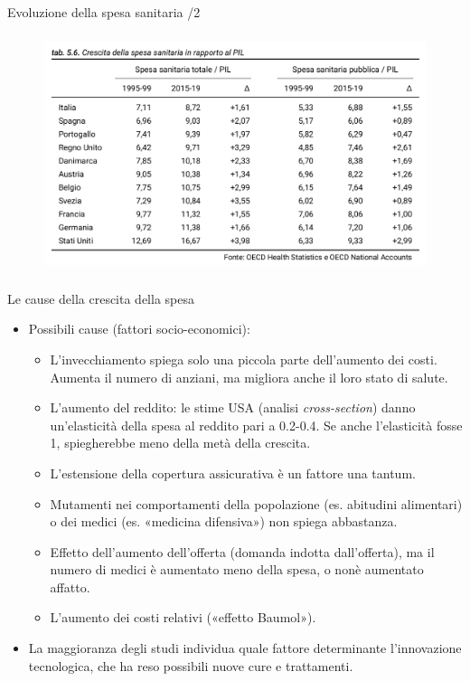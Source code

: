 \documentclass[aspectratio=64,12pt]{beamer}
\begin{document}
\begin{frame}{Evoluzione della spesa sanitaria /2}
\begin{figure}[htbp]
\centering
\includegraphics[height=7cm]{./figure/crescita-spesa-sanitaria.png}
\end{figure}
\end{frame}


\begin{frame}{Le cause della crescita della spesa}
\begin{itemize}
\item Possibili cause (fattori socio-economici):
\begin{itemize}
\item L'\alert{invecchiamento} spiega solo una piccola parte dell'aumento dei
costi. Aumenta il numero di anziani, ma migliora anche il loro stato di
salute.
\item L'\alert{aumento del reddito}: le stime USA (analisi
  \emph{cross-section}) danno un'elasticità della spesa al reddito pari a
  0.2-0.4. Se anche l'elasticità fosse 1, spiegherebbe meno della metà
  della crescita.
\item L'\alert{estensione della copertura assicurativa} è un fattore una tantum.
\item Mutamenti nei comportamenti della popolazione (es. abitudini alimentari) o
dei medici (es. «medicina difensiva») non spiega abbastanza.
\item Effetto dell'aumento dell'offerta (domanda indotta dall'offerta), ma il
numero di medici è aumentato meno della spesa, o nonè  aumentato affatto.
\item L'aumento dei costi relativi («effetto Baumol»).
\end{itemize}
\item La maggioranza degli studi individua quale fattore determinante
l'\alert{innovazione tecnologica}, che ha reso possibili nuove cure e
trattamenti.
\end{itemize}
\end{frame}
\end{document}
